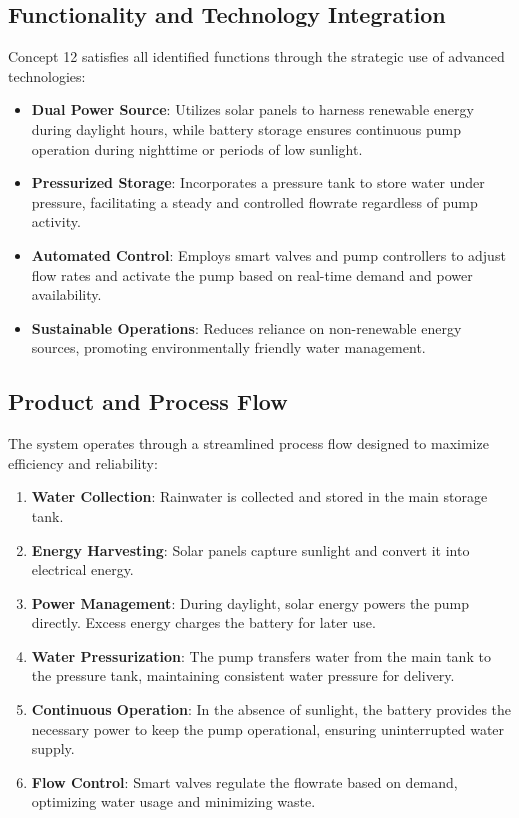 \documentclass[12pt]{report}
\begin{document}
\subsection{Functionality and Technology Integration}

Concept 12 satisfies all identified functions through the strategic use of advanced technologies:

\begin{itemize}
    \item \textbf{Dual Power Source}: Utilizes solar panels to harness renewable energy during daylight hours, while battery storage ensures continuous pump operation during nighttime or periods of low sunlight.
    \item \textbf{Pressurized Storage}: Incorporates a pressure tank to store water under pressure, facilitating a steady and controlled flowrate regardless of pump activity.
    \item \textbf{Automated Control}: Employs smart valves and pump controllers to adjust flow rates and activate the pump based on real-time demand and power availability.
    \item \textbf{Sustainable Operations}: Reduces reliance on non-renewable energy sources, promoting environmentally friendly water management.
\end{itemize}

\subsection{Product and Process Flow}

The system operates through a streamlined process flow designed to maximize efficiency and reliability:

\begin{enumerate}
    \item \textbf{Water Collection}: Rainwater is collected and stored in the main storage tank.
    \item \textbf{Energy Harvesting}: Solar panels capture sunlight and convert it into electrical energy.
    \item \textbf{Power Management}: During daylight, solar energy powers the pump directly. Excess energy charges the battery for later use.
    \item \textbf{Water Pressurization}: The pump transfers water from the main tank to the pressure tank, maintaining consistent water pressure for delivery.
    \item \textbf{Continuous Operation}: In the absence of sunlight, the battery provides the necessary power to keep the pump operational, ensuring uninterrupted water supply.
    \item \textbf{Flow Control}: Smart valves regulate the flowrate based on demand, optimizing water usage and minimizing waste.
\end{enumerate}
\end{document}
